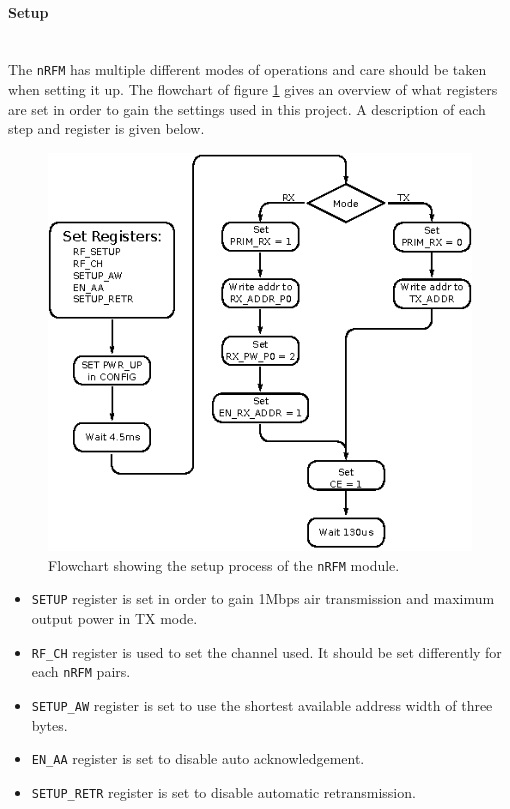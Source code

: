 \paragraph{Setup} %
\label{par:nrfsetup}
~\\
The \texttt{nRFM} has multiple different modes of operations and care should be taken when setting it up.
The flowchart of figure \ref{fig:nrf_setup} gives an overview of what registers are set in order to gain the settings used in this project.
A description of each step and register is given below.
\begin{figure}[h]
	\centering
	\includegraphics[width=.8\linewidth]{graphics/nfr_setup}
	\caption{Flowchart showing the setup process of the \texttt{nRFM} module.}
	\label{fig:nrf_setup}
\end{figure}
\begin{itemize}
	\item \texttt{SETUP} register is set in order to gain 1Mbps air transmission and maximum output power in TX mode.
	\item \texttt{RF\_CH} register is used to set the channel used. It should be set differently for each \texttt{nRFM} pairs.
	\item \texttt{SETUP\_AW} register is set to use the shortest available address width of three bytes.
	\item \texttt{EN\_AA} register is set to disable auto acknowledgement.
	\item \texttt{SETUP\_RETR} register is set to disable automatic retransmission.
\end{itemize}

